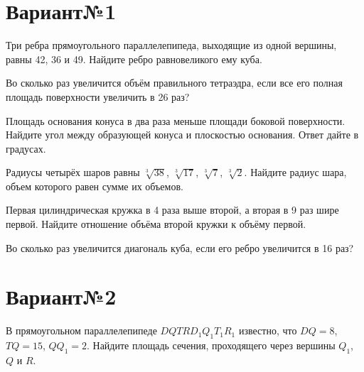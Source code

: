 \documentclass[4apaper]{article}
\begin{document}
\newpage\section*{Вариант№1}

\begin{taskBN}{1}
Три ребра прямоугольного параллелепипеда, выходящие из одной вершины, равны 42, 36 и 49. Найдите ребро равновеликого ему куба.
\end{taskBN}

\begin{taskBN}{2}
Во сколько раз увеличится объём правильного тетраэдра, если все его полная площадь поверхности увеличить в 26 раз?
\end{taskBN}

\begin{taskBN}{3}
Площадь основания конуса в два раза меньше площади боковой поверхности. Найдите угол между образующей конуса и плоскостью основания. Ответ дайте в градусах.
\end{taskBN}

\begin{taskBN}{4}
Радиусы четырёх шаров равны $\sqrt[3]{38}$, $\sqrt[3]{17}$, $\sqrt[3]{7}$, $\sqrt[3]{2}$. Найдите радиус шара, объем которого равен сумме их объемов.
\end{taskBN}

\begin{taskBN}{5}
 Первая цилиндрическая кружка в 4 раза выше второй, а вторая в 9 раз шире первой. Найдите отношение объёма второй кружки к объёму первой.
\end{taskBN}

\begin{taskBN}{6}
Во сколько раз увеличится диагональ куба, если его ребро увеличится в 16 раз?
\end{taskBN}
\newpage\section*{Вариант№2}

\begin{taskBN}{1}
В прямоугольном параллелепипеде  $DQTRD_{1}Q_{1}T_{1}R_{1}$  известно, что  $DQ = 8$, $TQ = 15$, $QQ_{1} = 2$. Найдите площадь сечения, проходящего через вершины $Q_{1}$, $Q$ и $R$.
\end{taskBN}
\end{document}
